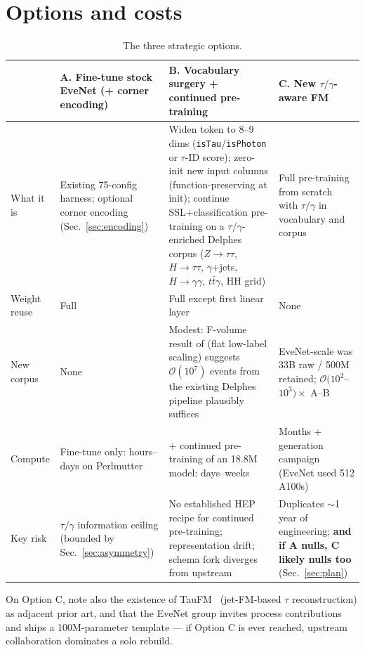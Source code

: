 \documentclass[11pt]{article}
\begin{document}
\section{Options and costs}
\label{sec:options}

\begin{table}[h]
\centering\small
\begin{tabular}{@{}p{2.6cm}p{3.8cm}p{4.2cm}p{3.6cm}@{}}
\toprule
& \textbf{A. Fine-tune stock EveNet} (+ corner encoding) &
\textbf{B. Vocabulary surgery + continued pre-training} &
\textbf{C. New $\tau/\gamma$-aware FM} \\
\midrule
What it is &
Existing 75-config harness; optional corner encoding
(Sec.~\ref{sec:encoding}) &
Widen token to 8--9 dims (\texttt{isTau}/\texttt{isPhoton} or $\tau$-ID
score); zero-init new input columns (function-preserving at init);
continue SSL+classification pre-training on a $\tau/\gamma$-enriched
Delphes corpus ($Z\to\tau\tau$, $H\to\tau\tau$, $\gamma$+jets,
$H\to\gamma\gamma$, $t\bar t\gamma$, HH grid) &
Full pre-training from scratch with $\tau/\gamma$ in vocabulary and
corpus \\
\addlinespace
Weight reuse & Full & Full except first linear layer & None \\
\addlinespace
New corpus & None &
Modest: F-volume result of \cite{Elsharkawy:2026} (flat low-label
scaling) suggests $\mathcal{O}(10^7)$ events from the existing Delphes
pipeline plausibly suffices &
EveNet-scale was 33B raw / 500M retained;
$\mathcal{O}(10^2$--$10^3)\times$ A--B \\
\addlinespace
Compute & Fine-tune only: hours--days on Perlmutter &
+ continued pre-training of an 18.8M model: days--weeks &
Months + generation campaign (EveNet used 512 A100s) \\
\addlinespace
Key risk & $\tau/\gamma$ information ceiling (bounded by
Sec.~\ref{sec:asymmetry}) &
No established HEP recipe for continued pre-training; representation
drift; schema fork diverges from upstream &
Duplicates $\sim$1 year of engineering; \textbf{and if A nulls, C likely
nulls too} (Sec.~\ref{sec:plan}) \\
\bottomrule
\end{tabular}
\caption{The three strategic options.}
\label{tab:options}
\end{table}

\noindent
On Option C, note also the existence of TauFM~\cite{TauFM:2025} (jet-FM-based
$\tau$ reconstruction) as adjacent prior art, and that the EveNet group
invites process contributions and ships a 100M-parameter template ---
if Option C is ever reached, upstream collaboration dominates a solo rebuild.
\end{document}
